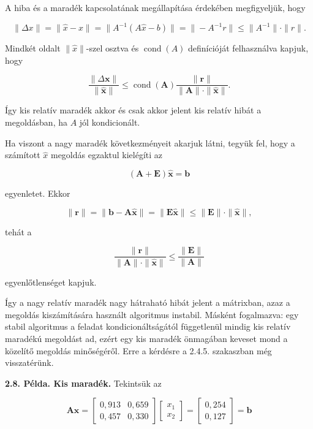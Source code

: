 \documentclass[
  magyar,
  11pt]{article}
\providecommand{\boldsymbol}[1]{\mathbf{#1}}
\begin{document}
A hiba és a maradék kapcsolatának megállapítása érdekében megfigyeljük,
hogy

\[\|\Delta x\| = \|\hat{x} - x\| = \|A^{-1}(A\hat{x} - b)\| = \|-A^{-1}r\| \le \|A^{-1}\| \cdot \|r\|.\]

Mindkét oldalt \(\|\hat{x}\|\)-szel osztva és \(\operatorname{cond}(A)\)
definícióját felhasználva kapjuk, hogy

\[\frac{\|\Delta \boldsymbol{x}\|}{\|\hat{\boldsymbol{x}}\|} \leq \operatorname{cond}(\boldsymbol{A}) \frac{\|\boldsymbol{r}\|}{\|\boldsymbol{A}\| \cdot \|\hat{\boldsymbol{x}}\|}.\]

Így kis relatív maradék akkor és csak akkor jelent kis relatív hibát a
megoldásban, ha \(A\) jól kondicionált.

Ha viszont a nagy maradék következményeit akarjuk látni, tegyük fel,
hogy a számított \(\hat{x}\) megoldás egzaktul kielégíti az

\[(\boldsymbol{A} + \boldsymbol{E})\hat{\boldsymbol{x}} = \boldsymbol{b}\]

egyenletet. Ekkor

\[\|\boldsymbol{r}\| = \|\boldsymbol{b} - \boldsymbol{A}\hat{\boldsymbol{x}}\| = \|\boldsymbol{E}\hat{\boldsymbol{x}}\| \le \|\boldsymbol{E}\| \cdot \|\hat{\boldsymbol{x}}\|,\]

tehát a

\[\frac{\|\boldsymbol{r}\|}{\|\boldsymbol{A}\|\cdot\|\hat{\boldsymbol{x}}\|} \leq \frac{\|\boldsymbol{E}\|}{\|\boldsymbol{A}\|}\]

egyenlőtlenséget kapjuk.

Így a nagy relatív maradék nagy hátraható hibát jelent a mátrixban, azaz
a megoldás kiszámítására használt algoritmus instabil. Másként
fogalmazva: egy stabil algoritmus a feladat kondicionáltságától
függetlenül mindig kis relatív maradékú megoldást ad, ezért egy kis
maradék önmagában keveset mond a közelítő megoldás minőségéről. Erre a
kérdésre a 2.4.5. szakaszban még visszatérünk.

\textbf{2.8. Példa. Kis maradék.} Tekintsük az

\[\boldsymbol{Ax} = \begin{bmatrix} 0{,}913 & 0{,}659 \\ 0{,}457 & 0{,}330 \end{bmatrix} \begin{bmatrix} x_1 \\ x_2 \end{bmatrix} = \begin{bmatrix} 0{,}254 \\ 0{,}127 \end{bmatrix} = \boldsymbol{b}\]
\end{document}
